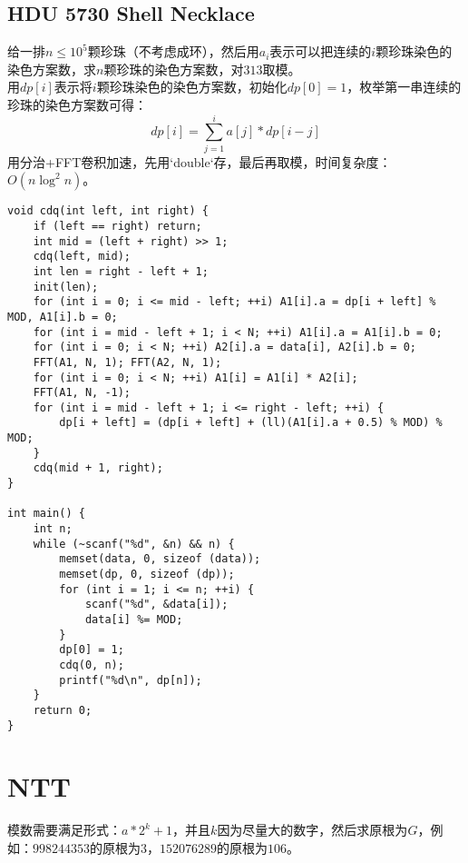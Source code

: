 \subsection{HDU 5730 Shell Necklace}
给一排$n\leq 10^5$颗珍珠（不考虑成环），然后用$a_i$表示可以把连续的$i$颗珍珠染色的染色方案数，求$n$颗珍珠的染色方案数，对$313$取模。 \\

用$dp[i]$表示将$i$颗珍珠染色的染色方案数，初始化$dp[0]=1$，枚举第一串连续的珍珠的染色方案数可得：
$$
dp[i]=\sum_{j=1}^{i}a[j]*dp[i-j]
$$
用分治+FFT卷积加速，先用`double`存，最后再取模，时间复杂度：$O(n\log^2 n)$。
\begin{lstlisting}
void cdq(int left, int right) {
    if (left == right) return;
    int mid = (left + right) >> 1;
    cdq(left, mid);
    int len = right - left + 1;
    init(len);
    for (int i = 0; i <= mid - left; ++i) A1[i].a = dp[i + left] % MOD, A1[i].b = 0;
    for (int i = mid - left + 1; i < N; ++i) A1[i].a = A1[i].b = 0;
    for (int i = 0; i < N; ++i) A2[i].a = data[i], A2[i].b = 0;
    FFT(A1, N, 1); FFT(A2, N, 1);
    for (int i = 0; i < N; ++i) A1[i] = A1[i] * A2[i];
    FFT(A1, N, -1);
    for (int i = mid - left + 1; i <= right - left; ++i) {
        dp[i + left] = (dp[i + left] + (ll)(A1[i].a + 0.5) % MOD) % MOD;
    }
    cdq(mid + 1, right);
}

int main() {
    int n;
    while (~scanf("%d", &n) && n) {
        memset(data, 0, sizeof (data));
        memset(dp, 0, sizeof (dp));
        for (int i = 1; i <= n; ++i) {
            scanf("%d", &data[i]);
            data[i] %= MOD;
        }
        dp[0] = 1;
        cdq(0, n);
        printf("%d\n", dp[n]);
    }
    return 0;
}
\end{lstlisting}
\section{NTT}
模数需要满足形式：$a*2^{k}+1$，并且$k$因为尽量大的数字，然后求原根为$G$，例如：$998244353$的原根为$3$，$152076289$的原根为$106$。 \\

